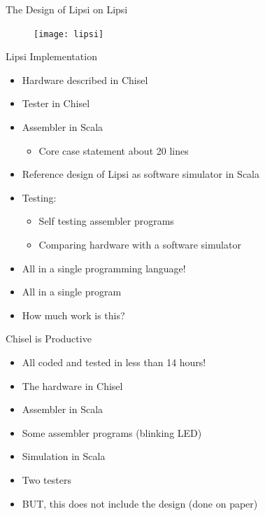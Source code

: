 \begin{frame}[fragile]{The Design of Lipsi on Lipsi}
\begin{figure}
    \centering
    \texttt{[image: lipsi]}
\end{figure}
\end{frame}

\begin{frame}[fragile]{Lipsi Implementation}
\begin{itemize}
\item Hardware described in Chisel
\item Tester in Chisel
\item Assembler in Scala
\begin{itemize}
\item Core case statement about 20 lines
\end{itemize}
\item Reference design of Lipsi as software simulator in Scala
\item Testing:
\begin{itemize}
\item Self testing assembler programs
\item Comparing hardware with a software simulator
\end{itemize}
\item All in a single programming language!
\item All in a single program
\item How much work is this?
\end{itemize}
\end{frame}

\begin{frame}[fragile]{Chisel is Productive}
\begin{itemize}
\item All coded and tested in less than 14 hours!
\end{itemize}
\begin{itemize}
\item The hardware in Chisel
\item Assembler in Scala
\item Some assembler programs (blinking LED)
\item Simulation in Scala
\item Two testers
\end{itemize}
\begin{itemize}
\item BUT, this does not include the design (done on paper)
\end{itemize}
\end{frame}

